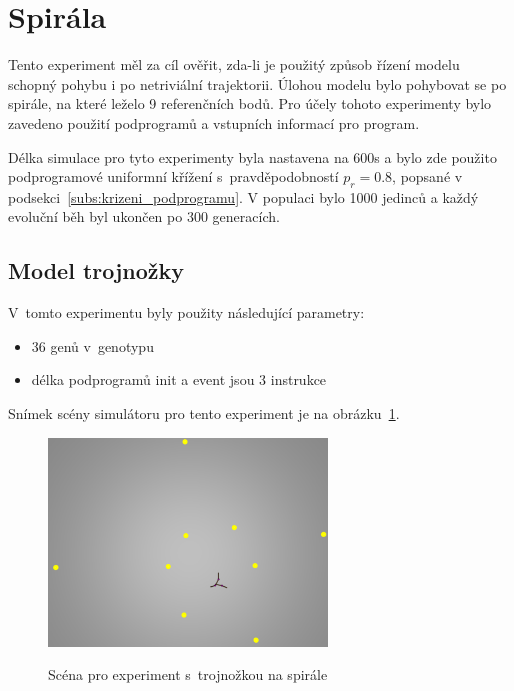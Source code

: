 

\section{Spirála}
\label{sec:experiment_spirala}
Tento experiment měl za cíl ověřit, zda-li je použitý způsob řízení modelu schopný pohybu i po netriviální trajektorii.
Úlohou modelu bylo pohybovat se po spirále, na které leželo 9 referenčních bodů.
Pro účely tohoto experimenty bylo zavedeno použití podprogramů a vstupních informací pro program.

Délka simulace pro tyto experimenty byla nastavena na 600s a bylo zde použito podprogramové uniformní křížení s~pravděpodobností $p_r = 0.8$, popsané v podsekci~\ref{subs:krizeni_podprogramu}.
V populaci bylo 1000 jedinců a každý evoluční běh byl ukončen po 300 generacích.

\subsection{Model trojnožky}
V~tomto experimentu byly použity následující parametry:
\begin{itemize}
    \item 36 genů v~genotypu
    \item délka podprogramů init a event jsou 3 instrukce
\end{itemize}

Snímek scény simulátoru pro tento experiment je na obrázku~\ref{fig:trojnozka_spirala_zhora}.
\begin{figure}[h]
    \centering
    {\includegraphics[width=20em]{obrazky/trojnozka_spirala_zhora.png}}
    \caption{
    Scéna pro experiment s~trojnožkou na spirále
    }
    \label{fig:trojnozka_spirala_zhora}
\end{figure}

